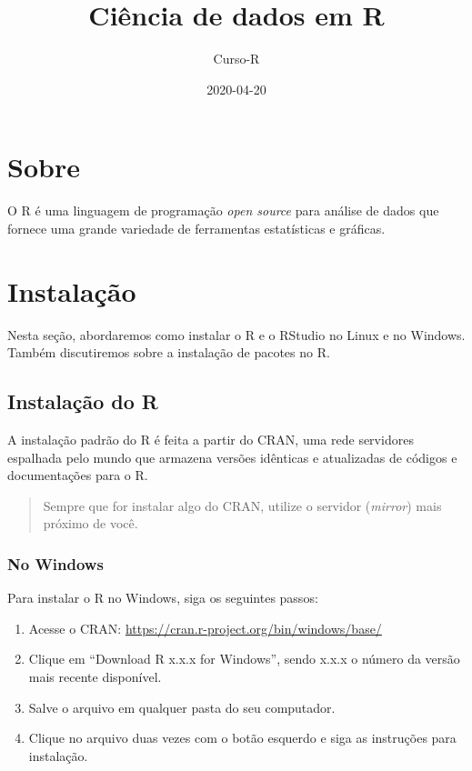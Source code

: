 \documentclass[
]{book}
\title{Ciência de dados em R}
\author{Curso-R}
\date{2020-04-20}
\begin{document}
\maketitle

{
\setcounter{tocdepth}{1}
\tableofcontents
}
\hypertarget{sobre}{%
\chapter*{Sobre}\label{sobre}}

O R é uma linguagem de programação \emph{open source} para análise de dados que fornece uma grande variedade de ferramentas estatísticas e gráficas.

\hypertarget{instalauxe7uxe3o}{%
\chapter{Instalação}\label{instalauxe7uxe3o}}

Nesta seção, abordaremos como instalar o R e o RStudio no Linux e no Windows. Também discutiremos sobre a instalação de pacotes no R.

\hypertarget{instalauxe7uxe3o-do-r}{%
\section{Instalação do R}\label{instalauxe7uxe3o-do-r}}

A instalação padrão do R é feita a partir do CRAN, uma rede servidores espalhada pelo mundo que armazena versões idênticas e atualizadas de códigos e documentações para o R.

\begin{quote}
Sempre que for instalar algo do CRAN, utilize o servidor (\emph{mirror}) mais próximo de você.
\end{quote}

\hypertarget{no-windows}{%
\subsection{No Windows}\label{no-windows}}

Para instalar o R no Windows, siga os seguintes passos:

\begin{enumerate}
\def\labelenumi{\arabic{enumi}.}
\item
  Acesse o CRAN: \url{https://cran.r-project.org/bin/windows/base/}
\item
  Clique em ``Download R x.x.x for Windows'', sendo x.x.x o número da versão mais recente disponível.
\item
  Salve o arquivo em qualquer pasta do seu computador.
\item
  Clique no arquivo duas vezes com o botão esquerdo e siga as instruções para instalação.
\end{enumerate}
\end{document}

